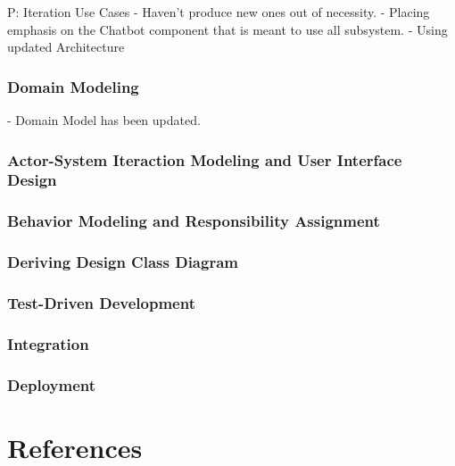 \documentclass[11pt]{article}
\begin{document}
P: Iteration Use Cases
- Haven't produce new ones out of necessity.
- Placing emphasis on the Chatbot component that is meant to use all subsystem.
- Using updated Architecture

\subsubsection{Domain Modeling}
- Domain Model has been updated.

\subsubsection{Actor-System Iteraction Modeling and User Interface Design}

\subsubsection{Behavior Modeling and Responsibility Assignment}

\subsubsection{Deriving Design Class Diagram}

\subsubsection{Test-Driven Development}

\subsubsection{Integration}

\subsubsection{Deployment}

\section{References}


\end{document}
